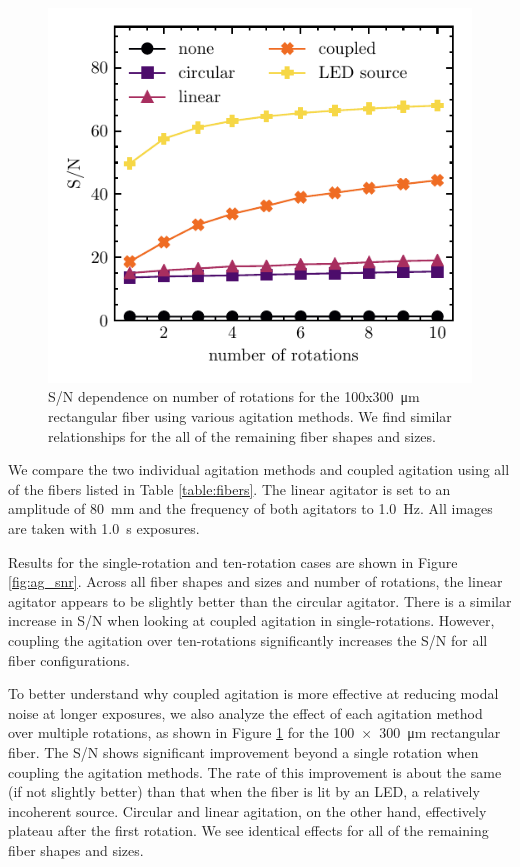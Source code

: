 \documentclass[twocolumn]{emulateapj}
\begin{document}
\begin{figure}
\centering
	\includegraphics[width=\columnwidth]{images/rect_snr_vs_time.pdf}
	\caption{S/N dependence on number of rotations for the 100x\SI{300}{\micro\meter} rectangular fiber using various agitation methods. We find similar relationships for the all of the remaining fiber shapes and sizes.}
\label{fig:rect_snr_vs_time}
\end{figure}

We compare the two individual agitation methods and coupled agitation using all of the fibers listed in Table \ref{table:fibers}. The linear agitator is set to an amplitude of \SI{80}{\milli\meter} and the frequency of both agitators to \SI{1.0}{\hertz}. All images are taken with \SI{1.0}{\second} exposures.

Results for the single-rotation and ten-rotation cases are shown in Figure \ref{fig:ag_snr}. Across all fiber shapes and sizes and number of rotations, the linear agitator appears to be slightly better than the circular agitator. There is a similar increase in S/N when looking at coupled agitation in single-rotations. However, coupling the agitation over ten-rotations significantly increases the S/N for all fiber configurations.

To better understand why coupled agitation is more effective at reducing modal noise at longer exposures, we also analyze the effect of each agitation method over multiple rotations, as shown in Figure \ref{fig:rect_snr_vs_time} for the \SI{100x300}{\micro\meter} rectangular fiber. The S/N shows significant improvement beyond a single rotation when coupling the agitation methods. The rate of this improvement is about the same (if not slightly better) than that when the fiber is lit by an LED, a relatively incoherent source. Circular and linear agitation, on the other hand, effectively plateau after the first rotation. We see identical effects for all of the remaining fiber shapes and sizes.
\end{document}
